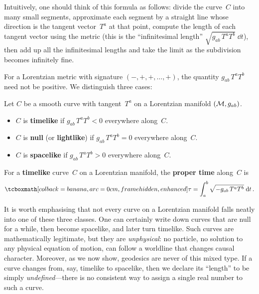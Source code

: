 Intuitively, one should think of this formula as follows:
divide the curve~$C$ into many small segments, approximate
each segment by a straight line whose direction is the tangent
vector~$T^a$ at that point, compute the length of each tangent
vector using the metric (this is the ``infinitesimal length''
$\sqrt{g_{ab}\,T^a T^b}\;\dd t$), then add up all the
infinitesimal lengths and take the limit as the subdivision
becomes infinitely fine.

For a Lorentzian metric with signature $(-,+,+,\dots,+)$, the
quantity $g_{ab}\,T^a T^b$ need not be positive.  We
distinguish three cases:

\begin{definition}%
\label{def:causal-character}
  Let $C$ be a smooth curve with tangent~$T^a$ on a Lorentzian
  manifold $(\mathcal{M},g_{ab})$.
  \begin{itemize}
    \item $C$ is \textbf{timelike} if
      $g_{ab}\,T^a T^b < 0$ everywhere along~$C$.
    \item $C$ is \textbf{null} (or \textbf{lightlike}) if
      $g_{ab}\,T^a T^b = 0$ everywhere along~$C$.
    \item $C$ is \textbf{spacelike} if
      $g_{ab}\,T^a T^b > 0$ everywhere along~$C$.
  \end{itemize}
\end{definition}

\begin{definition}\label{def:proper-time}
  For a \textbf{timelike} curve~$C$ on a Lorentzian manifold,
  the \textbf{proper time} along~$C$ is
  \begin{equation}\label{eq:proper-time}
    \eqbox{\tau = \int_a^b \sqrt{-g_{ab}\,T^a T^b}\;\dd t}\,.
  \end{equation}
\end{definition}

It is worth emphasising that not every curve on a Lorentzian
manifold falls neatly into one of these three classes.  One can
certainly write down curves that are null for a while, then
become spacelike, and later turn timelike.  Such curves are
mathematically legitimate, but they are \emph{unphysical}: no
particle, no solution to any physical equation of motion, can
follow a worldline that changes causal character.  Moreover,
as we now show, geodesics are never of this mixed type.  If a
curve changes from, say, timelike to spacelike, then we declare
its ``length'' to be simply \emph{undefined}---there is no
consistent way to assign a single real number to such a curve.


